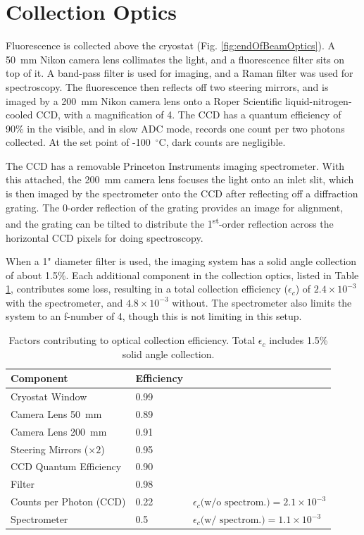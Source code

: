 \section{Collection Optics}
\label{sec:collection}

Fluorescence is collected above the cryostat (Fig. \ref{fig:endOfBeamOptics}).  A 50~mm Nikon camera lens collimates the light, and a fluorescence filter sits on top of it.  A band-pass filter is used for imaging, and a Raman filter was used for spectroscopy.  The fluorescence then reflects off two steering mirrors, and is imaged by a 200~mm Nikon camera lens onto a Roper Scientific liquid-nitrogen-cooled CCD, with a magnification of 4.  The CCD has a quantum efficiency of 90\% in the visible, and in slow ADC mode, records one count per two photons collected.  At the set point of -100~$^{\circ}$C, dark counts are negligible.

The CCD has a removable Princeton Instruments imaging spectrometer.  With this attached, the 200~mm camera lens focuses the light onto an inlet slit, which is then imaged by the spectrometer onto the CCD after reflecting off a diffraction grating.  The 0-order reflection of the grating provides an image for alignment, and the grating can be tilted to distribute the 1\textsuperscript{st}-order reflection across the horizontal CCD pixels for doing spectroscopy.

When a 1" diameter filter is used, the imaging system has a solid angle collection of about 1.5\%.  Each additional component in the collection optics, listed in Table \ref{table:colleff}, contributes some loss, resulting in a total collection efficiency ($\epsilon_{c}$) of $2.4 \times 10^{-3}$ with the spectrometer, and $4.8 \times 10^{-3}$ without.  The spectrometer also limits the system to an f-number of 4, though this is not limiting in this setup.

\begin{table} [!htbp]
\caption{Factors contributing to optical collection efficiency.  Total $\epsilon_{c}$ includes 1.5\% solid angle collection.}
\label{table:colleff}
\begin{tabular}{l l l}
Component & Efficiency & \\
\hline
Cryostat Window & 0.99 & \\
Camera Lens 50~mm & 0.89 & \\
Camera Lens 200~mm & 0.91 & \\
Steering Mirrors ($\times 2$) & 0.95 & \\
CCD Quantum Efficiency & 0.90 & \\
Filter & 0.98 & \\
Counts per Photon (CCD) & 0.22 & $\epsilon_{c}\text{(w/o spectrom.)} = 2.1 \times 10^{-3}$\\
\hline
Spectrometer & 0.5 & $\epsilon_{c}\text{(w/ spectrom.)} = 1.1 \times 10^{-3}$\\
\end{tabular}
\end{table}

